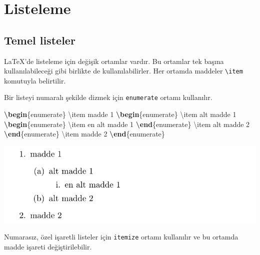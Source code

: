 \documentclass[
  10pt,
]{scrbook}
\newenvironment{Shaded}{\begin{snugshade}}{\end{snugshade}}
\newcommand{\ExtensionTok}[1]{#1}
\newcommand{\FunctionTok}[1]{\textcolor[rgb]{0.00,0.00,0.00}{#1}}
\newcommand{\KeywordTok}[1]{\textcolor[rgb]{0.13,0.29,0.53}{\textbf{#1}}}
\newcommand{\NormalTok}[1]{#1}
\theoremstyle{definition}
\theoremstyle{definition}
\theoremstyle{definition}
\theoremstyle{definition}
\theoremstyle{remark}
\begin{document}
\hypertarget{listeleme}{%
\section{Listeleme}\label{listeleme}}

\hypertarget{temel-listeler}{%
\subsection{Temel listeler}\label{temel-listeler}}

LaTeX'de listeleme için değişik ortamlar vardır. Bu ortamlar tek başına kullanılabileceği gibi birlikte de kullanılabilirler. Her ortamda maddeler \texttt{\textbackslash{}item} komutuyla belirtilir.

Bir listeyi numaralı şekilde dizmek için \texttt{enumerate} ortamı kullanılır.

\begin{Shaded}
\begin{Highlighting}[]
\KeywordTok{\textbackslash{}begin}\NormalTok{\{}\ExtensionTok{enumerate}\NormalTok{\}}
 \FunctionTok{\textbackslash{}item}\NormalTok{ madde 1}
  \KeywordTok{\textbackslash{}begin}\NormalTok{\{}\ExtensionTok{enumerate}\NormalTok{\}}
    \FunctionTok{\textbackslash{}item}\NormalTok{ alt madde 1}
      \KeywordTok{\textbackslash{}begin}\NormalTok{\{}\ExtensionTok{enumerate}\NormalTok{\}}
        \FunctionTok{\textbackslash{}item}\NormalTok{ en alt madde 1}
      \KeywordTok{\textbackslash{}end}\NormalTok{\{}\ExtensionTok{enumerate}\NormalTok{\}}
    \FunctionTok{\textbackslash{}item}\NormalTok{ alt madde 2}
  \KeywordTok{\textbackslash{}end}\NormalTok{\{}\ExtensionTok{enumerate}\NormalTok{\}}
 \FunctionTok{\textbackslash{}item}\NormalTok{ madde 2}
\KeywordTok{\textbackslash{}end}\NormalTok{\{}\ExtensionTok{enumerate}\NormalTok{\}}
\end{Highlighting}
\end{Shaded}

\insvg

\includegraphics{examples/ex3.svg} \outsvg

Numarasız, özel işaretli listeler için \texttt{itemize} ortamı kullanılır ve bu ortamda madde işareti değiştirilebilir.
\end{document}
